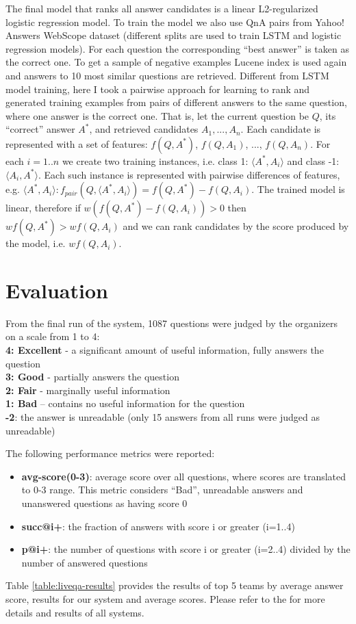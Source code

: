\documentclass[]{article}
\begin{document}
The final model that ranks all answer candidates is a linear L2-regularized logistic regression model.
To train the model we also use QnA pairs from Yahoo! Answers WebScope dataset (different splits are used to train LSTM and logistic regression models).
For each question the corresponding ``best answer'' is taken as the correct one.
To get a sample of negative examples Lucene index is used again and answers to 10 most similar questions are retrieved.
Different from LSTM model training, here I took a pairwise approach for learning to rank and generated training examples from pairs of different answers to the same question, where one answer is the correct one.
That is, let the current question be $Q$, its ``correct'' answer $A^*$, and retrieved candidates $A_1, ..., A_n$.
Each candidate is represented with a set of features: $f(Q, A^*)$, $f(Q, A_1)$, ..., $f(Q, A_n)$.
For each $i=1..n$ we create two training instances, i.e. class 1: $\langle A^*, A_i\rangle$ and class -1: $\langle A_i, A^*\rangle$.
Each such instance is represented with pairwise differences of features, e.g. $\langle A^*, A_i\rangle: f_{pair}(Q, \langle A^*, A_i\rangle) = f(Q, A^*) - f(Q, A_i)$.
The trained model is linear, therefore if $w(f(Q, A^*) - f(Q, A_i)) > 0$ then $w f(Q, A^*) > w f(Q, A_i)$ and we can rank candidates by the score produced by the model, i.e. $w f(Q, A_i)$.

\section{Evaluation}

From the final run of the system, 1087 questions were judged by the organizers on a scale from 1 to 4:\\
\textbf{4: Excellent} - a significant amount of useful information, fully answers the question\\
\textbf{3: Good} - partially answers the question\\
\textbf{2: Fair} - marginally useful information\\
\textbf{1: Bad} – contains no useful information for the question\\
\textbf{-2}: the answer is unreadable  (only 15 answers from all runs were judged as unreadable)

The following performance metrics were reported:
\begin{itemize}
\setlength\itemsep{0mm}
\item \textbf{avg-score(0-3)}: average score over all questions, where scores are translated to 0-3 range. This metric considers ``Bad'', unreadable answers and unanswered questions as having score 0
\item \textbf{succ@i+}: the fraction of answers with score i or greater (i=1..4)
\item \textbf{p@i+}: the number of questions with score i or greater (i=2..4) divided by the number of answered questions
\end{itemize}
Table \ref{table:liveqa-results} provides the results of top 5 teams by average answer score, results for our system and average scores.
Please refer to the \cite{liveqa} for more details and results of all systems.
\end{document}
